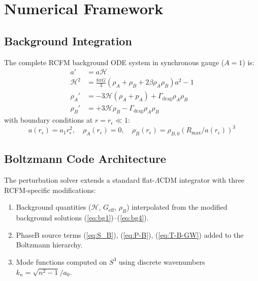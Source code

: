 \documentclass[10pt,twocolumn]{article}
\theoremstyle{definition}
\newcommand{\Rmax}{R_{\max}}
\newcommand{\rhoA}{\rho_{A}}
\newcommand{\rhoB}{\rho_{B}}
\newcommand{\Hcal}{\mathcal{H}}
\newcommand{\Geff}{G_{\mathrm{eff}}}
\newcommand{\Gammadrag}{\Gamma_{\mathrm{drag}}}
\begin{document}
\section{Numerical Framework}
\label{sec:numerical}

\subsection{Background Integration}

The complete RCFM background ODE system in synchronous
gauge (\( A=1 \)) is:
\begin{align}
  a'  &= a\Hcal\label{eq:bg1}\\
  \Hcal^{2}
      &= \frac{8\pi G}{3}(\rhoA+\rhoB+2\beta\rhoA\rhoB)a^{2}-1
         \label{eq:bg2}\\
  \rhoA'
      &= -3\Hcal(\rhoA+p_{A})+\Gammadrag\rhoA\rhoB
         \label{eq:bg3}\\
  \rhoB'
      &= +3\Hcal\rhoB-\Gammadrag\rhoA\rhoB
         \label{eq:bg4}
\end{align}
with boundary conditions at \( r=r_{\epsilon}\ll1 \):
\begin{equation}
  a(r_{\epsilon}) = a_{1}r_{\epsilon}^{2},
  \quad
  \rhoA(r_{\epsilon}) = 0,
  \quad
  \rhoB(r_{\epsilon})
    = \rho_{B,0}(\Rmax/a(r_{\epsilon}))^{3}
\end{equation}

\subsection{Boltzmann Code Architecture}

The perturbation solver extends a standard flat-$\Lambda$CDM
integrator with three RCFM-specific modifications:
\begin{enumerate}[label=(\roman*)]
  \item Background quantities (\( \Hcal \), \( \Geff \),
    \( \rhoB \)) interpolated from the modified background
    solutions (\ref{eq:bg1})--(\ref{eq:bg4}).
  \item Phase\nobreakspace{}B source terms
    (\ref{eq:S_B}), (\ref{eq:P-B}), (\ref{eq:T-B-GW})
    added to the Boltzmann hierarchy.
  \item Mode functions computed on \( S^{3} \) using
    discrete wavenumbers \( k_{n}=\sqrt{n^{2}-1}/a_{0} \).
\end{enumerate}
\end{document}

